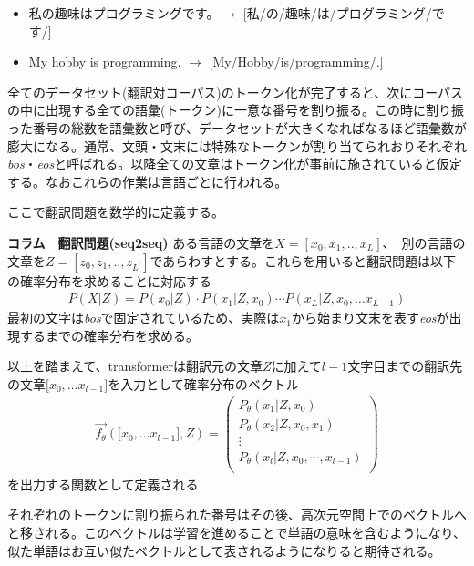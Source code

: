 \begin{itemize}
\item 私の趣味はプログラミングです。$\rightarrow$ [私/の/趣味/は/プログラミング/です/]
\item My hobby is programming. $\rightarrow$ [My/Hobby/is/programming/.]
\end{itemize}

全てのデータセット(翻訳対コーパス)のトークン化が完了すると、次にコーパスの中に出現する全ての語彙(トークン)に一意な番号を割り振る。この時に割り振った番号の総数を語彙数と呼び、データセットが大きくなればなるほど語彙数が膨大になる。通常、文頭・文末には特殊なトークンが割り当てられおりそれぞれ\emph{bos}・\emph{eos}と呼ばれる。以降全ての文章はトークン化が事前に施されていると仮定する。なおこれらの作業は言語ごとに行われる。

ここで翻訳問題を数学的に定義する。

\begin{itembox}{\bf コラム　翻訳問題(seq2seq)}
  ある言語の文章を$X = [x_0, x_1, .., x_{L}]$、　別の言語の文章を$Z = [z_0, z_1, .., z_{L^\prime}]$であらわすとする。これらを用いると翻訳問題は以下の確率分布を求めることに対応する
  \begin{align}
    P(X|Z) = P(x_0| Z) \cdot P(x_1| Z, x_0) \cdots P(x_L| Z, x_0, \ldots x_{L-1})
  \end{align}
  最初の文字は\emph{bos}で固定されているため、実際は$x_1$から始まり文末を表す\emph{eos}が出現するまでの確率分布を求める。

  以上を踏まえて、transformerは翻訳元の文章$Z$に加えて$l-1$文字目までの翻訳先の文章$\lbrack x_0, \ldots x_{l-1} \rbrack$を入力として確率分布のベクトル
  \begin{align}
    \label{eq:trans}
    \vec{f_\theta}(\lbrack x_0, \ldots x_{l-1} \rbrack,Z) = 
    \begin{pmatrix} 
      P_\theta(x_1 | Z, x_0)\\
      P_\theta(x_2 | Z, x_0, x_1)\\ 
      \vdots\\
      P_\theta(x_l | Z, x_0, \cdots, x_{l-1} )\\
      \end{pmatrix}
  \end{align}
  を出力する関数として定義される
\end{itembox}

\vspace{5mm}
それぞれのトークンに割り振られた番号はその後、高次元空間上でのベクトルへと移される。このベクトルは学習を進めることで単語の意味を含むようになり、似た単語はお互い似たベクトルとして表されるようになりると期待される。


